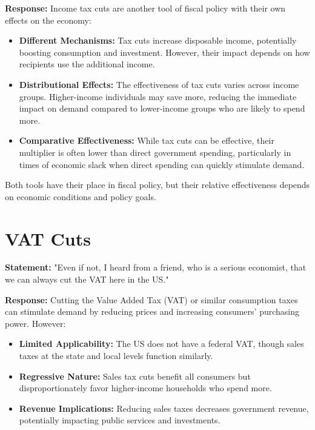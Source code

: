 \documentclass{article}
\begin{document}
\textbf{Response:}
Income tax cuts are another tool of fiscal policy with their own effects on the economy:

\begin{itemize}
    \item \textbf{Different Mechanisms:} Tax cuts increase disposable income, potentially boosting consumption and investment. However, their impact depends on how recipients use the additional income.
    \item \textbf{Distributional Effects:} The effectiveness of tax cuts varies across income groups. Higher-income individuals may save more, reducing the immediate impact on demand compared to lower-income groups who are likely to spend more.
    \item \textbf{Comparative Effectiveness:} While tax cuts can be effective, their multiplier is often lower than direct government spending, particularly in times of economic slack when direct spending can quickly stimulate demand.
\end{itemize}

Both tools have their place in fiscal policy, but their relative effectiveness depends on economic conditions and policy goals.

\hrulefill

\section{VAT Cuts}

\textbf{Statement:} "Even if not, I heard from a friend, who is a serious economist, that we can always cut the VAT here in the US."

\textbf{Response:}
Cutting the Value Added Tax (VAT) or similar consumption taxes can stimulate demand by reducing prices and increasing consumers’ purchasing power. However:

\begin{itemize}
    \item \textbf{Limited Applicability:} The US does not have a federal VAT, though sales taxes at the state and local levels function similarly. 
    \item \textbf{Regressive Nature:} Sales tax cuts benefit all consumers but disproportionately favor higher-income households who spend more.
    \item \textbf{Revenue Implications:} Reducing sales taxes decreases government revenue, potentially impacting public services and investments.
\end{itemize}
\end{document}
